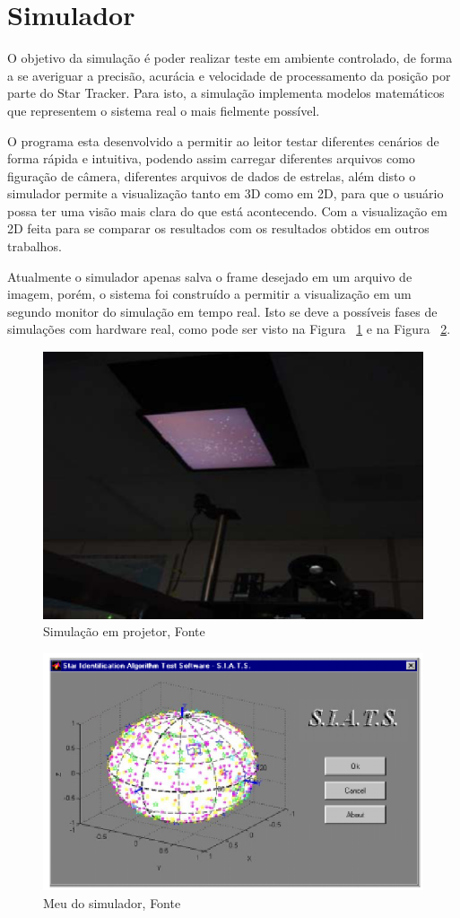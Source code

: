 \section{Simulador}
\label{cap:simulador}

O objetivo da simulação é poder realizar teste em ambiente controlado, 
de forma a se averiguar a precisão, acurácia e velocidade de processamento da posição por parte do Star Tracker. 
Para isto, a simulação implementa modelos matemáticos que representem o sistema real o mais fielmente possível. 

O programa esta desenvolvido a permitir ao leitor testar diferentes cenários de forma rápida e intuitiva,
podendo assim carregar diferentes arquivos como figuração de câmera, diferentes arquivos de dados de estrelas,
além disto o simulador permite a visualização tanto em 3D como em 2D, para que o usuário possa ter uma visão mais clara do que está acontecendo.
Com a visualização em 2D feita para se comparar os resultados com os resultados obtidos em outros trabalhos.

Atualmente o simulador apenas salva o frame desejado em um arquivo de imagem, porém, o sistema foi construído a permitir a visualização em um segundo monitor do simulação em tempo real.
Isto se deve a possíveis fases de simulações com hardware real, como pode ser visto na Figura ~\ref{fig:Simulador_top} e na Figura ~\ref{fig:Simulador_tipo_meu}.

\begin{figure}[H]
    \centering
    \includegraphics[width=.65\columnwidth]{images/Simulador_top.png}
    \caption{Simulação em projetor, Fonte ~\cite[]{Tappe}}
    \label{fig:Simulador_top}
\end{figure}

\begin{figure}[H]
    \centering
    \includegraphics[width=.65\columnwidth]{images/Simulador_tipo_meu.png}
    \caption{Meu do simulador, Fonte ~\cite[]{Carvalho}}
    \label{fig:Simulador_tipo_meu}
\end{figure}

